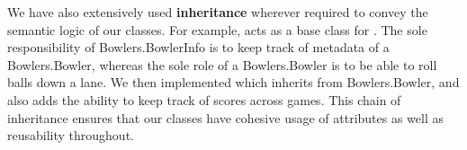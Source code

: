 We have also extensively used \textbf{inheritance} wherever required to convey the semantic logic of our classes. For example,  acts as a base class for . The sole responsibility of Bowlers.BowlerInfo is to keep track of metadata of a Bowlers.Bowler, whereas the sole role of a Bowlers.Bowler is to be able to roll balls down a lane. We then implemented  which inherits from Bowlers.Bowler, and also adds the ability to keep track of scores across games. This chain of inheritance ensures that our classes have cohesive usage of attributes as well as reusability throughout.